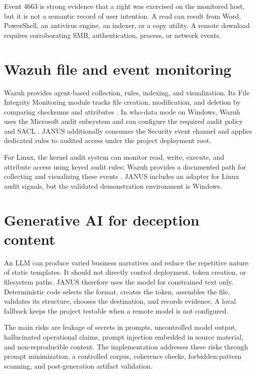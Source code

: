 Event 4663 is strong evidence that a right was exercised on the monitored host,
but it is not a semantic record of user intention. A read can result from Word,
PowerShell, an antivirus engine, an indexer, or a copy utility. A remote
download requires corroborating SMB, authentication, process, or network
events.

\section{Wazuh file and event monitoring}

Wazuh provides agent-based collection, rules, indexing, and visualization.
Its File Integrity Monitoring module tracks file creation, modification, and
deletion by comparing checksums and attributes \cite{wazuhFim}. In who-data
mode on Windows, Wazuh uses the Microsoft audit subsystem and can configure the
required audit policy and SACL \cite{wazuhWhodata}. JANUS additionally consumes
the Security event channel and applies dedicated rules to audited access under
the project deployment root.

For Linux, the kernel audit system can monitor read, write, execute, and
attribute access using keyed audit rules; Wazuh provides a documented path for
collecting and visualizing these events \cite{wazuhAuditd}. JANUS includes an
adapter for Linux audit signals, but the validated demonstration environment is
Windows.

\section{Generative AI for deception content}

An LLM can produce varied business narratives and reduce the repetitive nature
of static templates. It should not directly control deployment, token creation,
or filesystem paths. JANUS therefore uses the model for constrained text only.
Deterministic code selects the format, creates the token, assembles the file,
validates its structure, chooses the destination, and records evidence. A local
fallback keeps the project testable when a remote model is not configured.

The main risks are leakage of secrets in prompts, uncontrolled model output,
hallucinated operational claims, prompt injection embedded in source material,
and non-reproducible content. The implementation addresses these risks through
prompt minimization, a controlled corpus, coherence checks, forbidden-pattern
scanning, and post-generation artifact validation.


